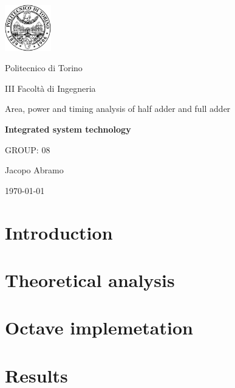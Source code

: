 \documentclass[10pt,  english, makeidx, a4paper, titlepage, oneside]{article}
\begin{document}
\begin{titlepage}
\vspace{2cm}
\centerline{
\includegraphics[width=2cm]{./img/logopoli.eps}}  
\centerline{\LARGE Politecnico di Torino}
\bigskip
\centerline{\Large III Facolt\`a di Ingegneria}
\vspace{4cm}
\centerline{\Huge\sf Area, power and timing analysis of half adder and full adder}
\bigskip
\centerline{\Huge\bfseries\sf Integrated system technology}
\vspace{2cm}
\centerline{\Large GROUP: 08}
\vspace{2cm}
\centerline{\Large Jacopo Abramo}
\vspace{2cm}
\centerline{\Large \today}
\end{titlepage}

\tableofcontents

\newpage

\lstset{language=VHDL}

\newpage
\section{Introduction} \label{intro}


\newpage
\section{Theoretical analysis}\label{theo_analysis}


\newpage
\section{Octave implemetation}


\newpage
\section{Results}


\newpage

\end{document}
